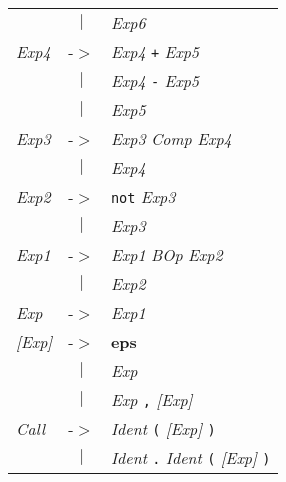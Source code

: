 \documentclass{article}
\begin{document}
\begin{center}
\begin{tabular}{lll}
 & \multicolumn{1}{c}{\textbf{$|$}} & \textit{Exp6} \\
\textit{Exp4} & -$>$ & \textit{Exp4} \texttt{+} \textit{Exp5} \\
 & \multicolumn{1}{c}{\textbf{$|$}} & \textit{Exp4} \texttt{-} \textit{Exp5} \\
 & \multicolumn{1}{c}{\textbf{$|$}} & \textit{Exp5} \\
\textit{Exp3} & -$>$ & \textit{Exp3} \textit{Comp} \textit{Exp4} \\
 & \multicolumn{1}{c}{\textbf{$|$}} & \textit{Exp4} \\
\textit{Exp2} & -$>$ & \texttt{not} \textit{Exp3} \\
 & \multicolumn{1}{c}{\textbf{$|$}} & \textit{Exp3} \\
\textit{Exp1} & -$>$ & \textit{Exp1} \textit{BOp} \textit{Exp2} \\
 & \multicolumn{1}{c}{\textbf{$|$}} & \textit{Exp2} \\
\textit{Exp} & -$>$ & \textit{Exp1} \\
\textit{[Exp]} & -$>$ & \textbf{eps} \\
 & \multicolumn{1}{c}{\textbf{$|$}} & \textit{Exp} \\
 & \multicolumn{1}{c}{\textbf{$|$}} & \textit{Exp} \texttt{,} \textit{[Exp]} \\
\textit{Call} & -$>$ & \textit{Ident} \texttt{(} \textit{[Exp]} \texttt{)} \\
 & \multicolumn{1}{c}{\textbf{$|$}} & \textit{Ident} \texttt{.} \textit{Ident} \texttt{(} \textit{[Exp]} \texttt{)} \\
\end{tabular}\end{center}
\end{document}
